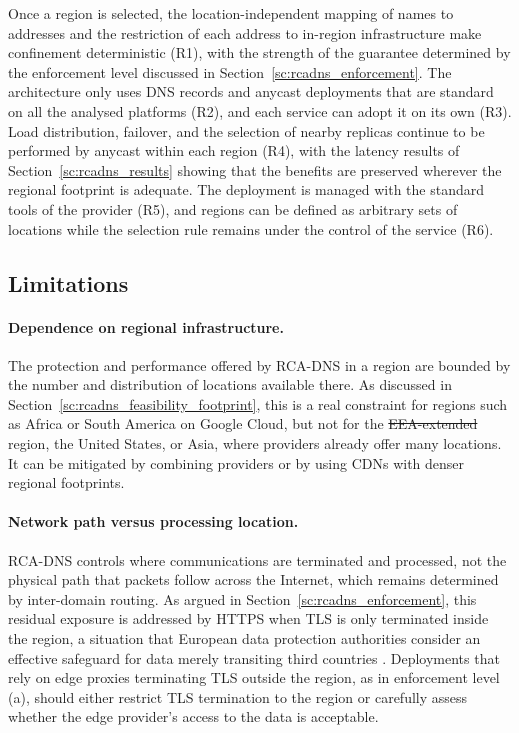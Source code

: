 \documentclass[
A4paper,                %
twoside,                %
openright,              %
chapterprefix=true,     %
12pt,                   %
headings=normal,        %
titlepage=on            %
]{book}
\makeatletter
\providecommand{\DIFaddtex}[1]{{\protect\color{blue}\uwave{#1}}} %
\providecommand{\DIFdeltex}[1]{{\protect\color{red}\sout{#1}}} %
\providecommand{\DIFaddbegin}{} %
\providecommand{\DIFaddend}{} %
\providecommand{\DIFdelbegin}{} %
\providecommand{\DIFdelend}{} %
\providecommand{\DIFadd}[1]{\texorpdfstring{\DIFaddtex{#1}}{#1}} %
\providecommand{\DIFdel}[1]{\texorpdfstring{\DIFdeltex{#1}}{}} %
\providecommand{\DIFscaledelfig}{0.5}
\newlength{\DIFdelgraphicswidth} %
\newlength{\DIFdelgraphicsheight} %
\providecommand{\DIFaddincludegraphics}[2][]{{\color{blue}\fbox{\DIFOincludegraphics[#1]{#2}}}} %
\providecommand{\DIFdelincludegraphics}[2][]{%
\sbox{\DIFdelgraphicsbox}{\DIFOincludegraphics[#1]{#2}}%
\settoboxwidth{\DIFdelgraphicswidth}{\DIFdelgraphicsbox} %
\settoboxtotalheight{\DIFdelgraphicsheight}{\DIFdelgraphicsbox} %
\scalebox{\DIFscaledelfig}{%
\parbox[b]{\DIFdelgraphicswidth}{\usebox{\DIFdelgraphicsbox}\\[-\baselineskip] \rule{\DIFdelgraphicswidth}{0em}}\llap{\resizebox{\DIFdelgraphicswidth}{\DIFdelgraphicsheight}{%
\setlength{\unitlength}{\DIFdelgraphicswidth}%
\begin{picture}(1,1)%
\thicklines\linethickness{2pt} %
{\color[rgb]{1,0,0}\put(0,0){\framebox(1,1){}}}%
{\color[rgb]{1,0,0}\put(0,0){\line( 1,1){1}}}%
{\color[rgb]{1,0,0}\put(0,1){\line(1,-1){1}}}%
\end{picture}%
}\hspace*{3pt}}} %
} %
\DeclareRobustCommand{\DIFaddbegin}{\DIFOaddbegin \let\includegraphics\DIFaddincludegraphics} %
\DeclareRobustCommand{\DIFaddend}{\DIFOaddend \let\includegraphics\DIFOincludegraphics} %
\DeclareRobustCommand{\DIFdelbegin}{\DIFOdelbegin \let\includegraphics\DIFdelincludegraphics} %
\DeclareRobustCommand{\DIFdelend}{\DIFOaddend \let\includegraphics\DIFOincludegraphics} %
\let\sout@orig\sout %
\renewcommand{\sout}[1]{\ifmmode\text{\sout@orig{\ensuremath{#1}}}\else\sout@orig{#1}\fi} %
\makeatother
\begin{document}
Once a region is selected, the location-independent mapping of names to addresses and the restriction of each address to in-region infrastructure make confinement deterministic (R1), with the strength of the guarantee determined by the enforcement level discussed in Section~\ref{sc:rcadns_enforcement}. The architecture only uses DNS records and anycast deployments that are standard on all the analysed platforms (R2), and each service can adopt it on its own (R3). Load distribution, failover, and the selection of nearby replicas continue to be performed by anycast within each region (R4), with the latency results of Section~\ref{sc:rcadns_results} showing that the benefits are preserved wherever the regional footprint is adequate. The deployment is managed with the standard tools of the provider (R5), and regions can be defined as arbitrary sets of locations while the selection rule remains under the control of the service (R6).

\subsection{Limitations}
\label{sc:rcadns_discussion_limitations}

\paragraph{Dependence on regional infrastructure.} The protection and performance offered by RCA-DNS in a region are bounded by the number and distribution of locations available there. As discussed in Section~\ref{sc:rcadns_feasibility_footprint}, this is a real constraint for regions such as Africa or South America on Google Cloud, but not for the \DIFdelbegin \DIFdel{EEA-extended }\DIFdelend \DIFaddbegin \DIFadd{EEA-Extended }\DIFaddend region, the United States, or Asia, where providers already offer many locations. It can be mitigated by combining providers or by using CDNs with denser regional footprints.

\paragraph{Network path versus processing location.} RCA-DNS controls where communications are terminated and processed, not the physical path that packets follow across the Internet, which remains determined by inter-domain routing. As argued in Section~\ref{sc:rcadns_enforcement}, this residual exposure is addressed by HTTPS when TLS is only terminated inside the region, a situation that European data protection authorities consider an effective safeguard for data merely transiting third countries \cite{RecommendationsBoard}. Deployments that rely on edge proxies terminating TLS outside the region, as in enforcement level (a), should either restrict TLS termination to the region or carefully assess whether the edge provider's access to the data is acceptable.
\end{document}
